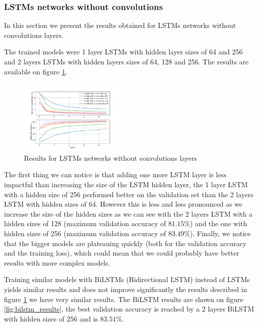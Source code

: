 \documentclass[10pt,twocolumn,letterpaper]{article}
\begin{document}
\subsubsection{LSTMs networks without convolutions}

In this section we present the results obtained for LSTMs networks without convolutions layers.

The trained models were 1 layer LSTMs with hidden layer sizes of 64 and 256 and 2 layers LSTMs with hidden layers sizes of 64, 128 and 256. The results are available on figure \ref{fig:lstm_results}.

\begin{figure}[h] 
\centering
\includegraphics[width=0.45\textwidth]{images/simple_lstm_results.png}
\caption{Results for LSTMs networks without convolutions layers}
\label{fig:lstm_results}
\end{figure}

The first thing we can notice is that adding one more LSTM layer is less impactful than increasing the size of the LSTM hidden layer, the 1 layer LSTM with a hidden size of 256 performed better on the validation set than the 2 layers LSTM with hidden sizes of 64. However this is less and less pronounced as we increase the size of the hidden sizes as we can see with the 2 layers LSTM with a hidden sizes of 128 (maximum validation accuracy of $81.15\%$) and the one with hidden sizes of 256 (maximum validation accuracy of $83.49\%$). Finally, we notice that the bigger models are plateauing quickly (both for the validation accuracy and the training loss), which could mean that we could probably have better results with more complex models.

Training similar models with BiLSTMs (Bidirectional LSTM) instead of LSTMs yields similar results and does not improve significantly the results described in figure \ref{fig:lstm_results} we have very similar results. The BiLSTM results are shown on figure \ref{fig:bilstm_results}, the best validation accuracy is reached by a 2 layers BiLSTM with hidden sizes of 256 and is $83.51\%$.
\end{document}
